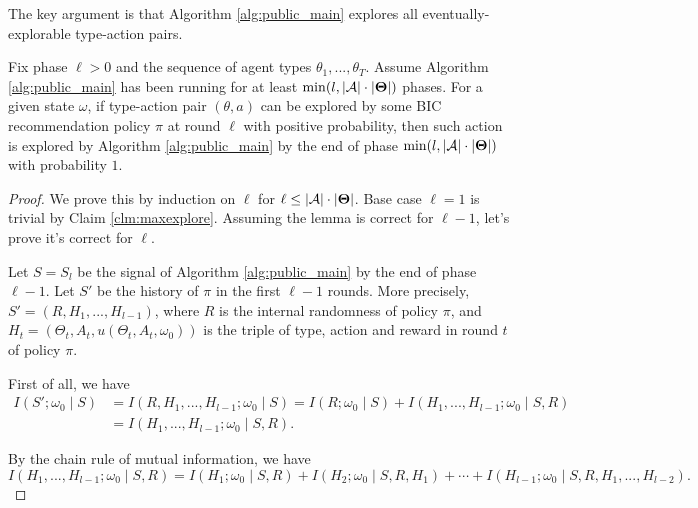 The key argument is that Algorithm \ref{alg:public_main} explores all  eventually-explorable type-action pairs.

\begin{lemma}
\label{lem:exp_public}
Fix phase $\ell>0$ and the sequence of agent types $\theta_1,...,\theta_T$. Assume Algorithm \ref{alg:public_main} has been running for at least $\min(l, |\mathcal{A}|\cdot |\bold{\Theta}|)$ phases.
For a given state $\omega$, if type-action pair $(\theta,a)$ can be explored by some BIC recommendation policy $\pi$ at round $\ell$ with positive probability, then such action is explored by Algorithm \ref{alg:public_main} by the end of phase $\min(l, |\mathcal{A}|\cdot |\bold{\Theta}|)$ with probability $1$.
\end{lemma}

\begin{proof}
We prove this by induction on $\ell$ for $\ell \leq |\mathcal{A}|\cdot |\bold{\Theta}|$. Base case $\ell=1$ is trivial by Claim \ref{clm:maxexplore}. Assuming the lemma is correct for $\ell-1$, let's prove it's correct for $\ell$.

Let $S= S_l$ be the signal of Algorithm \ref{alg:public_main} by the end of phase $\ell-1$.  Let $S'$ be the history of $\pi$ in the first $\ell-1$ rounds. More precisely,
    $S' = (R, H_1,...,H_{l-1})$,
where $R$ is the internal randomness of policy $\pi$, and
    $H_t = (\Theta_t, A_t, u(\Theta_t, A_t, \omega_0))$
is the triple of type, action and reward in round $t$ of policy $\pi$.


First of all, we have
\begin{align*}
I(S'; \omega_0\mid  S)
    &= I(R,H_1,...,H_{l-1}; \omega_0\mid  S)
    = I(R; \omega_0\mid  S) + I(H_1,...,H_{l-1}; \omega_0\mid S, R) \\
    &= I(H_1,...,H_{l-1}; \omega_0\mid S, R).
\end{align*}

By the chain rule of mutual information, we have
\[
 I(H_1,...,H_{l-1}; \omega_0\mid S, R) = I(H_1;\omega_0\mid S,R) + I(H_2;\omega_0\mid S, R ,H_1) + \cdots + I(H_{l-1}; \omega_0\mid S,R,H_1,...,H_{l-2}).
\]


\end{proof}
